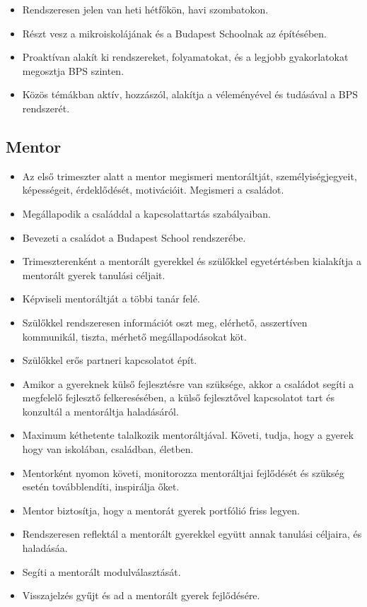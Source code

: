 \begin{itemize}

\item
  Rendszeresen jelen van heti hétfőkön, havi szombatokon.
\item
  Részt vesz a mikroiskolájának és a Budapest Schoolnak az építésében.
\item
  Proaktívan alakít ki rendszereket, folyamatokat, és a legjobb
  gyakorlatokat megosztja BPS szinten.
\item
  Közös témákban aktív, hozzászól, alakítja a véleményével és tudásával
  a BPS rendszerét.
\end{itemize}

\subsection{Mentor}\label{mentor}

\begin{itemize}
\item
  Az első trimeszter alatt a mentor megismeri mentoráltját,
  személyiségjegyeit, képességeit, érdeklődését, motivációit. Megismeri
  a családot.
\item
  Megállapodik a családdal a kapcsolattartás szabályaiban.
\item
  Bevezeti a családot a Budapest School rendszerébe.
\item
  Trimeszterenként a mentorált gyerekkel és szülőkkel egyetértésben
  kialakítja a mentorált gyerek tanulási céljait.
\item
  Képviseli mentoráltját a többi tanár felé.
\item
  Szülőkkel rendszeresen információt oszt meg, elérhető, asszertíven
  kommunikál, tiszta, mérhető megállapodásokat köt.
\item
  Szülőkkel erős partneri kapcsolatot épít.
\item
  Amikor a gyereknek külső fejlesztésre van szüksége, akkor a családot
  segíti a megfelelő fejlesztő felkeresésében, a külső fejlesztővel
  kapcsolatot tart és konzultál a mentoráltja haladásáról.
\item
  Maximum kéthetente talalkozik mentoráltjával. Követi, tudja, hogy a
  gyerek hogy van iskolában, családban, életben.
\item
  Mentorként nyomon követi, monitorozza mentoráltjai fejlődését és
  szükség esetén továbblendíti, inspirálja őket.
\item
  Mentor biztosítja, hogy a mentorát gyerek portfólió friss legyen.
\item
  Rendszeresen reflektál a mentorált gyerekkel együtt annak tanulási
  céljaira, és haladásáa.
\item
  Segíti a mentorált modulválasztását.
\item
  Visszajelzés gyűjt és ad a mentorált gyerek fejlődésére.
\end{itemize}

